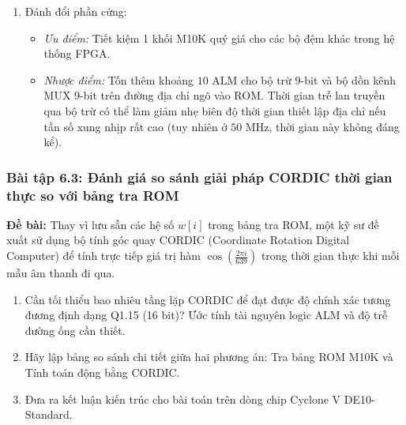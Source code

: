 \begin{enumerate}[label=(\alph*)]
    \item Đánh đổi phần cứng:
    \begin{itemize}[leftmargin=1.5em, itemsep=2pt]
        \item \emph{Ưu điểm:} Tiết kiệm 1 khối M10K quý giá cho các bộ đệm khác trong hệ thống FPGA.
        \item \emph{Nhược điểm:} Tốn thêm khoảng $10\text{ ALM}$ cho bộ trừ 9-bit và bộ dồn kênh MUX 9-bit trên đường địa chỉ ngõ vào ROM. Thời gian trễ lan truyền qua bộ trừ có thể làm giảm nhẹ biên độ thời gian thiết lập địa chỉ nếu tần số xung nhịp rất cao (tuy nhiên ở $50\text{ MHz}$, thời gian này không đáng kể).
    \end{itemize}
\end{enumerate}

\subsubsection*{Bài tập 6.3: Đánh giá so sánh giải pháp CORDIC thời gian thực so với bảng tra ROM}
\textbf{Đề bài:} Thay vì lưu sẵn các hệ số $w[i]$ trong bảng tra ROM, một kỹ sư đề xuất sử dụng bộ tính góc quay CORDIC (Coordinate Rotation Digital Computer) để tính trực tiếp giá trị hàm $\cos\left(\frac{2\pi i}{639}\right)$ trong thời gian thực khi mỗi mẫu âm thanh đi qua.
\begin{enumerate}[label=(\alph*)]
    \item Cần tối thiểu bao nhiêu tầng lặp CORDIC để đạt được độ chính xác tương đương định dạng Q1.15 (16 bit)? Ước tính tài nguyên logic ALM và độ trễ đường ống cần thiết.
    \item Hãy lập bảng so sánh chi tiết giữa hai phương án: Tra bảng ROM M10K và Tính toán động bằng CORDIC.
    \item Đưa ra kết luận kiến trúc cho bài toán trên dòng chip Cyclone V DE10-Standard.
\end{enumerate}

